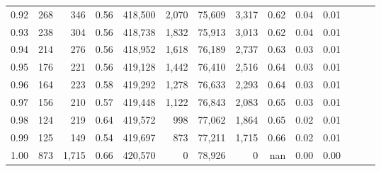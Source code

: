 \begin{tabular}{rrrrrrrrrrrrrr}
0.92 &    268 &    346 &  0.56 &  418,500 &    2,070 &  75,609 &   3,317 &  0.62 &  0.04 &      0.01 \\
0.93 &    238 &    304 &  0.56 &  418,738 &    1,832 &  75,913 &   3,013 &  0.62 &  0.04 &      0.01 \\
0.94 &    214 &    276 &  0.56 &  418,952 &    1,618 &  76,189 &   2,737 &  0.63 &  0.03 &      0.01 \\
0.95 &    176 &    221 &  0.56 &  419,128 &    1,442 &  76,410 &   2,516 &  0.64 &  0.03 &      0.01 \\
0.96 &    164 &    223 &  0.58 &  419,292 &    1,278 &  76,633 &   2,293 &  0.64 &  0.03 &      0.01 \\
0.97 &    156 &    210 &  0.57 &  419,448 &    1,122 &  76,843 &   2,083 &  0.65 &  0.03 &      0.01 \\
0.98 &    124 &    219 &  0.64 &  419,572 &      998 &  77,062 &   1,864 &  0.65 &  0.02 &      0.01 \\
0.99 &    125 &    149 &  0.54 &  419,697 &      873 &  77,211 &   1,715 &  0.66 &  0.02 &      0.01 \\
1.00 &    873 &  1,715 &  0.66 &  420,570 &        0 &  78,926 &       0 &   nan &  0.00 &      0.00 \\
\bottomrule
\end{tabular}
